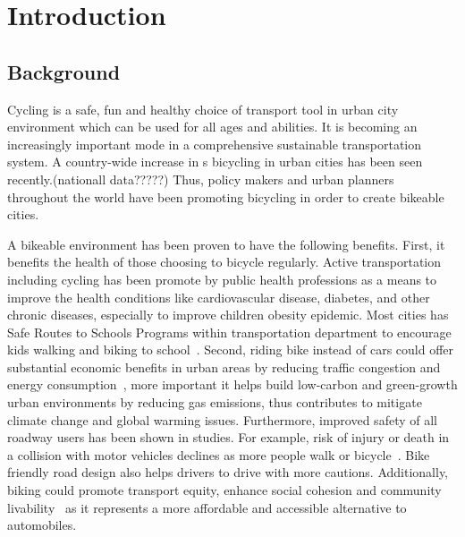 \documentclass [11pt, proquest] {uwthesis}[2015/03/03]
\begin{document}
%
%

%
 
 
 
%
%
%
\textpages
 
 
\chapter {Introduction}
 
\section{Background}
Cycling is a safe, fun and healthy choice of transport tool in urban city environment which can be used for all ages and abilities. It is becoming an increasingly important mode in a comprehensive sustainable transportation system.  A country-wide increase in s bicycling in urban cities has been seen recently.(nationall data?????) Thus, policy makers and urban planners throughout the world have been promoting bicycling in order to create bikeable cities.  

A bikeable environment has been proven to have the following benefits. First, it benefits the health of those choosing to bicycle regularly. Active transportation including cycling has been promote by public health professions as a means to improve the health conditions like cardiovascular disease, diabetes, and other chronic diseases, especially to improve children obesity epidemic. Most cities has Safe Routes to Schools Programs within transportation department to encourage kids walking and biking to school~\cite{Skerett01,Colditz97}. Second, riding bike instead of cars could offer substantial economic benefits in urban areas by reducing traffic congestion and energy consumption~\cite{Sener09}, more important it helps build low-carbon and green-growth urban environments by reducing gas emissions, thus contributes to mitigate climate change and global warming issues. Furthermore, improved safety of all roadway users has been shown in studies. For example, risk of injury or death in a collision with motor vehicles declines as more people walk or bicycle~\cite{Turner06,Wittink03}. Bike friendly road design also helps drivers to drive with more cautions. Additionally, biking could promote transport equity, enhance social cohesion and community livability~\cite{Litman07} as it represents a more affordable and accessible alternative to automobiles.
\end{document}
